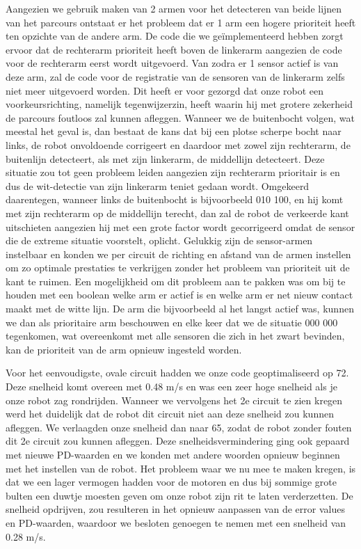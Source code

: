 Aangezien we gebruik maken van 2 armen voor het detecteren van beide lijnen van het parcours ontstaat er het probleem dat er 1 arm een hogere prioriteit heeft ten opzichte van de andere arm. De code die we ge\"implementeerd hebben zorgt ervoor dat de rechterarm prioriteit heeft boven de linkerarm aangezien de code voor de rechterarm eerst wordt uitgevoerd. Van zodra er 1 sensor actief is van deze arm, zal de code voor de registratie van de sensoren van de linkerarm zelfs niet meer uitgevoerd worden. Dit heeft er voor gezorgd dat onze robot een voorkeursrichting, namelijk tegenwijzerzin, heeft waarin hij met grotere zekerheid de parcours foutloos zal kunnen afleggen. Wanneer we de buitenbocht volgen, wat meestal het geval is, dan bestaat de kans dat bij een plotse scherpe bocht naar links, de robot onvoldoende corrigeert en daardoor met zowel zijn rechterarm, de buitenlijn detecteert, als met zijn linkerarm, de middellijn detecteert. Deze situatie zou tot geen probleem leiden aangezien zijn rechterarm prioritair is en dus de wit-detectie van zijn linkerarm teniet gedaan wordt. Omgekeerd daarentegen, wanneer links de buitenbocht is bijvoorbeeld 010 100, en hij komt met zijn rechterarm op de middellijn terecht, dan zal de robot de verkeerde kant uitschieten aangezien hij met een grote factor wordt gecorrigeerd omdat de sensor die de extreme situatie voorstelt, oplicht. Gelukkig zijn de sensor-armen instelbaar en konden we per circuit de richting en afstand van de armen instellen om zo optimale prestaties te verkrijgen zonder het probleem van prioriteit uit de kant te ruimen. Een mogelijkheid om dit probleem aan te pakken was om bij te houden met een boolean welke arm er actief is en welke arm er net nieuw contact maakt met de witte lijn. De arm die bijvoorbeeld al het langst actief was, kunnen we dan als prioritaire arm beschouwen en elke keer dat we de situatie 000 000 tegenkomen, wat overeenkomt met alle sensoren die zich in het zwart bevinden, kan de prioriteit van de arm opnieuw ingesteld worden.

Voor het eenvoudigste, ovale circuit hadden we onze code geoptimaliseerd op 72. Deze snelheid komt overeen met 0.48 m/s en was een zeer hoge snelheid als je onze robot zag rondrijden. Wanneer we vervolgens het 2e circuit te zien kregen werd het duidelijk dat de robot dit circuit niet aan deze snelheid zou kunnen afleggen. We verlaagden onze snelheid dan naar 65, zodat de robot zonder fouten dit 2e circuit zou kunnen afleggen. Deze snelheidsvermindering ging ook gepaard met nieuwe PD-waarden en we konden met andere woorden opnieuw beginnen met het instellen van de robot. Het probleem waar we nu mee te maken kregen, is dat we een lager vermogen hadden voor de motoren en dus bij sommige grote bulten een duwtje moesten geven om onze robot zijn rit te laten verderzetten. De snelheid opdrijven, zou resulteren in het opnieuw aanpassen van de error values en PD-waarden, waardoor we besloten genoegen te nemen met een snelheid van 0.28 m/s.


